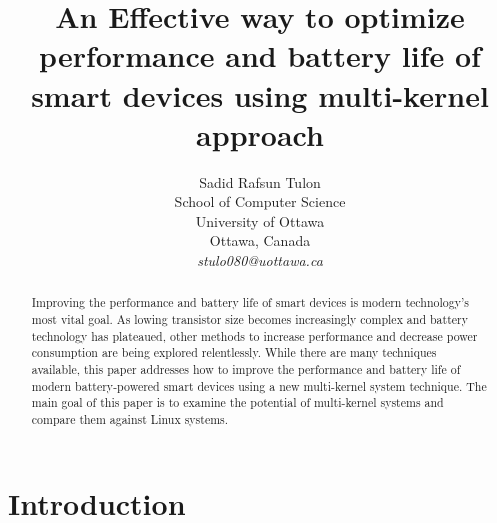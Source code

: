 \documentclass[11pt]{article}       %
\begin{document}


\title{An Effective way to optimize performance and battery life of smart devices using multi-kernel approach}


\author{
Sadid Rafsun Tulon\\
School of Computer Science\\
University of Ottawa\\
Ottawa, Canada\\
{\em stulo080@uottawa.ca}
} %

\maketitle

\begin{abstract}
Improving the performance and battery life of smart devices is modern technology's most vital goal. As lowing transistor size becomes increasingly complex and battery technology has plateaued, other methods to increase performance and decrease power consumption are being explored relentlessly. While there are many techniques available, this paper addresses how to improve the performance and battery life of modern battery-powered smart devices using a new multi-kernel system technique. The main goal of this paper is to examine the potential of multi-kernel systems and compare them against Linux systems.
\end{abstract}

\section{Introduction} \label{intro}
\end{document}
